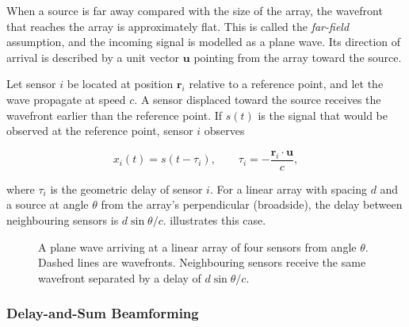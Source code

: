 When a source is far away compared with the size of the array, the wavefront that reaches the array is approximately flat. This is called the \emph{far-field} assumption, and the incoming signal is modelled as a plane wave. Its direction of arrival is described by a unit vector $\mathbf{u}$ pointing from the array toward the source.

Let sensor $i$ be located at position $\mathbf{r}_i$ relative to a reference point, and let the wave propagate at speed $c$. A sensor displaced toward the source receives the wavefront earlier than the reference point. If $s(t)$ is the signal that would be observed at the reference point, sensor $i$ observes

\begin{equation}
  x_i(t) = s(t - \tau_i),
  \qquad
  \tau_i = -\frac{\mathbf{r}_i \cdot \mathbf{u}}{c},
  \label{eq:geometric-delay}
\end{equation}

where $\tau_i$ is the geometric delay of sensor $i$. For a linear array with spacing $d$ and a source at angle $\theta$ from the array's perpendicular (broadside), the delay between neighbouring sensors is $d\sin\theta/c$.  illustrates this case.

\begin{figure}[H]
  \centering
  \caption{A plane wave arriving at a linear array of four sensors from angle $\theta$. Dashed lines are wavefronts. Neighbouring sensors receive the same wavefront separated by a delay of $d\sin\theta/c$.}
  \label{fig:plane-wave}
\end{figure}

\subsubsection{Delay-and-Sum Beamforming}
\label{sec:delay-and-sum-beamforming}

